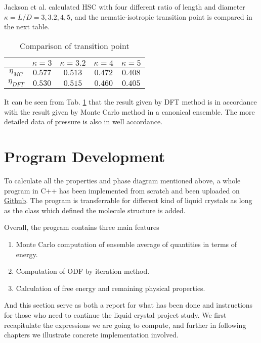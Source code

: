 Jackson et al. calculated HSC with four different ratio of length and diameter $\kappa=L/D=3,3.2,4,5$, and the nematic-isotropic transition point is compared in the next table.

\begin{table}[H]
	\caption{Comparison of transition point}
	\label{tab:comparison1995}
	\centering
	\begin{tabular}{c|cccc}
		\toprule
		 & $\kappa=3$ & $\kappa=3.2$ & $\kappa=4$ & $\kappa=5$\\
		\midrule
		$\eta_{MC}$ &  $0.577$ & $0.513$ & $0.472$ & $0.408$\\
		$\eta_{DFT}$ & $0.530$ & $0.515$ & $0.460$ & $0.405$\\
		\bottomrule
	\end{tabular}
\end{table}

It can be seen from Tab. \ref{tab:comparison1995} that the result given by DFT method is in accordance with the result given by Monte Carlo method in a canonical ensemble. The more detailed data of pressure is also in well accordance.


\section{Program Development}
To calculate all the properties and phase diagram mentioned above, a whole program in C++ has been implemented from scratch and been uploaded on \href{https://github.com/WolframC/liquidcrystal}{Github}. The program is transferrable for different kind of liquid crystals as long as the class which defined the molecule structure is added.

Overall, the program contains three main features
\begin{enumerate}
	\item Monte Carlo computation of ensemble average of quantities in terms of energy.
	\item Computation of ODF by iteration method.
	\item Calculation of free energy and remaining physical properties.
\end{enumerate}

And this section serve as both a report for what has been done and instructions for those who need to continue the liquid crystal project study. We first recapitulate the expressions we are going to compute, and further in following chapters we illustrate concrete implementation involved.

